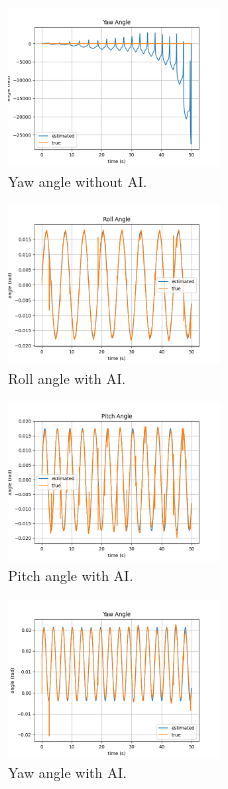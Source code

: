 \documentclass[conference]{IEEEtran}
\begin{document}
    \begin{figure}[H]
        \centerline{\includegraphics[width=0.5\textwidth]{../Figures/part_1_yaw_no_AI.png}}
        \caption{Yaw angle without AI.}
    \end{figure}
    \begin{figure}[H]
        \centerline{\includegraphics[width=0.5\textwidth]{../Figures/part_1_roll_AI.png}}
        \caption{Roll angle with AI.}
    \end{figure}
    \begin{figure}[H]
        \centerline{\includegraphics[width=0.5\textwidth]{../Figures/part_1_pitch_AI.png}}
        \caption{Pitch angle with AI.}
    \end{figure}
    \begin{figure}[H]
        \centerline{\includegraphics[width=0.5\textwidth]{../Figures/part_1_yaw_AI.png}}
        \caption{Yaw angle with AI.}
    \end{figure}
    
\end{document}
